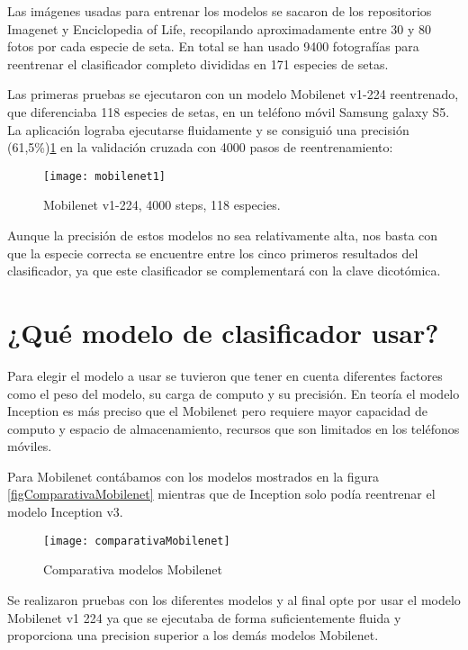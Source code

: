 Las imágenes usadas para entrenar los modelos se sacaron de los repositorios Imagenet y Enciclopedia of Life, recopilando aproximadamente entre 30 y 80 fotos por cada especie de seta. En total se han usado 9400 fotografías para reentrenar el clasificador completo divididas en 171 especies de setas.

Las primeras pruebas se ejecutaron con un modelo Mobilenet v1-224 reentrenado, que diferenciaba 118 especies de setas, en un teléfono móvil Samsung galaxy S5. La aplicación lograba ejecutarse fluidamente y se consiguió una precisión (61,5\%)\ref{figMobilenet1} en la validación cruzada con 4000 pasos de reentrenamiento:

\begin{figure}[h]
    \begin{center}%
        \begin{center}%
          \texttt{[image: mobilenet1]}%
          \caption{Mobilenet v1-224, 4000 steps, 118 especies.}%
          \label{figMobilenet1}%
        \end{center}%
  	\end{center}%
\end{figure}%

Aunque la precisión de estos modelos no sea relativamente alta, nos basta con que la especie correcta se encuentre entre los cinco primeros resultados del clasificador, ya que este clasificador se complementará con la clave dicotómica.

\section{¿Qué modelo de clasificador usar?}

Para elegir el modelo a usar se tuvieron que tener en cuenta diferentes factores como el peso del modelo, su carga de computo y su precisión. En teoría el modelo Inception es más preciso que el Mobilenet pero requiere mayor capacidad de computo y espacio de almacenamiento, recursos que son limitados en los teléfonos móviles.

Para Mobilenet contábamos con los modelos mostrados en la figura \ref{figComparativaMobilenet} mientras que de Inception solo podía reentrenar el modelo Inception v3.

\begin{figure}[h]
    \begin{center}%
        \begin{center}%
          \texttt{[image: comparativaMobilenet]}%
          \caption{Comparativa modelos Mobilenet}%
          \label{figComparativaMobilenet.}%
        \end{center}%
  	\end{center}%
\end{figure}%
\newpage
Se realizaron pruebas con los diferentes modelos y al final opte por usar el modelo Mobilenet v1 224 ya que se ejecutaba de forma suficientemente fluida y proporciona una precision superior a los demás modelos Mobilenet. 

